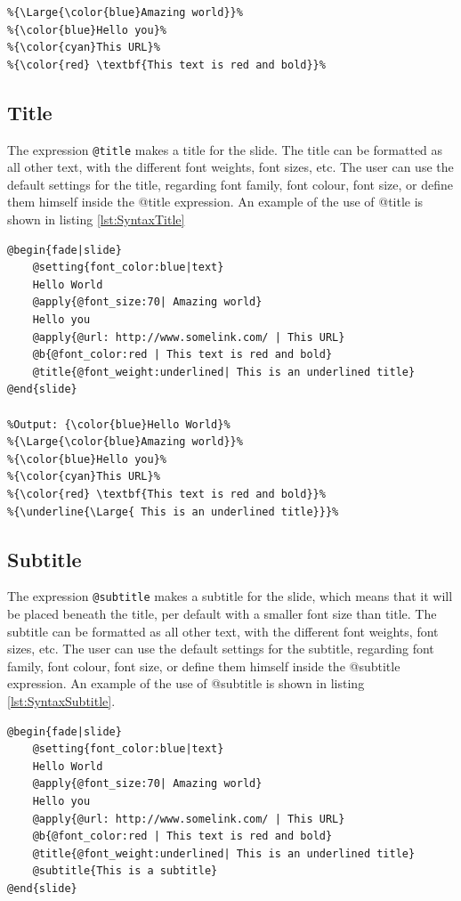 {\begin{lstlisting}[frame=single, caption=Hello World with font weight, label=lst:SyntaxBUI]
%Output: {\color{blue}Hello World}%
%{\Large{\color{blue}Amazing world}}%
%{\color{blue}Hello you}%
%{\color{cyan}This URL}%
%{\color{red} \textbf{This text is red and bold}}%
\end{lstlisting}

\subsection{Title}
The expression \texttt{@title} makes a title for the slide. The title can be formatted as all other text, with the different font weights, font sizes, etc. The user can use the default settings for the title, regarding font family, font colour, font size, or define them himself inside the @title expression.
An example of the use of @title is shown in listing \ref{lst:SyntaxTitle}

\begin{lstlisting}[frame=single, caption=Hello World with title, label=lst:SyntaxTitle]
@begin{fade|slide}
    @setting{font_color:blue|text}
    Hello World
    @apply{@font_size:70| Amazing world}
    Hello you
    @apply{@url: http://www.somelink.com/ | This URL}
    @b{@font_color:red | This text is red and bold}
    @title{@font_weight:underlined| This is an underlined title}
@end{slide}

%Output: {\color{blue}Hello World}%
%{\Large{\color{blue}Amazing world}}%
%{\color{blue}Hello you}%
%{\color{cyan}This URL}%
%{\color{red} \textbf{This text is red and bold}}%
%{\underline{\Large{ This is an underlined title}}}%
\end{lstlisting}


\subsection{Subtitle}
The expression \texttt{@subtitle} makes a subtitle for the slide, which means that it will be placed beneath the title, per default with a smaller font size than title. The subtitle can be formatted as all other text, with the different font weights, font sizes, etc. The user can use the default settings for the subtitle, regarding font family, font colour, font size, or define them himself inside the @subtitle expression.
An example of the use of @subtitle is shown in listing \ref{lst:SyntaxSubtitle}.
\begin{lstlisting}[frame=single, caption=Hello World with subtitle, label=lst:SyntaxSubtitle]
@begin{fade|slide}
    @setting{font_color:blue|text}
    Hello World
    @apply{@font_size:70| Amazing world}
    Hello you
    @apply{@url: http://www.somelink.com/ | This URL}
    @b{@font_color:red | This text is red and bold}
    @title{@font_weight:underlined| This is an underlined title}
    @subtitle{This is a subtitle}
@end{slide}


\end{lstlisting}}
